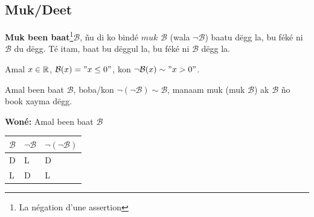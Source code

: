 \documentclass[twoside, a4paper]{article}
\begin{document}
\subsection{Muk/Deet}
\begin{tcolorbox}[enhanced jigsaw,breakable,pad at break*=1mm, colback=red!5!white,colframe=white!75!black,title= Téeki,
  watermark color=white]
 \textbf{Muk been baat}\footnote{La négation d'une assertion}$\mathcal{B}$, ñu di ko bindé $\textit{muk } \mathcal{B}$ (wala $\neg  \mathcal{B}$) baatu dëgg la, bu féké ni $\mathcal{B}$ du dëgg. Té itam, baat bu dëggul la, bu féké ni $\mathcal{B}$ dëgg la.
\end{tcolorbox}
Amal $x \in \mathbb{R}$, $\mathcal{B}(x) = " x \leq 0"$, kon $\neg \mathcal{B}(x) \sim "x > 0"$.

\begin{tcolorbox}[enhanced jigsaw,breakable,pad at break*=1mm, colback=blue!5!white,colframe=white!75!black,title= Tèg\footnote{Proposition},
  watermark color=white]
Amal been baat $\mathcal{B}$, boba/kon $\neg (\neg \mathcal{B}) \sim \mathcal{B}$, manaam muk (muk $\mathcal{B}$) ak $\mathcal{B}$ ño book xayma dëgg.
\end{tcolorbox}

\textbf{Woné:}
\vspace{0.3cm}
Amal been baat $\mathcal{B}$ \newline
\vspace{0.3cm}
\begin{tabularx}{0.8\textwidth} { 
  | >{\centering\arraybackslash}X 
  | >{\centering\arraybackslash}X 
  | >{\centering\arraybackslash}X | }
 \hline
$\mathcal{B}$& $\neg\mathcal{B}$ & $\neg(\neg\mathcal{B})$\\
\hline
 D  & L & D  \\
 L  & D & L  \\
\hline
\end{tabularx}
\end{document}
